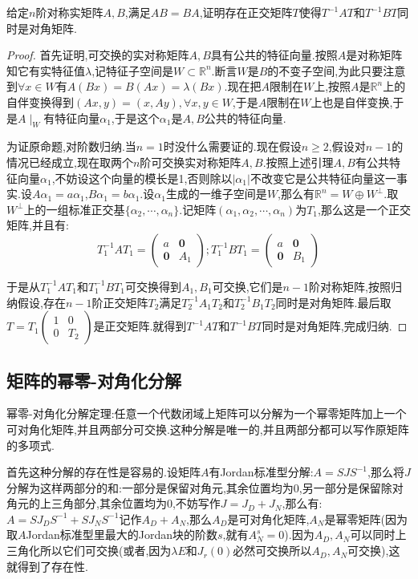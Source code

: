 给定$n$阶对称实矩阵$A,B$,满足$AB=BA$,证明存在正交矩阵$T$使得$T^{-1}AT$和$T^{-1}BT$同时是对角矩阵.
\begin{proof}
	
	首先证明,可交换的实对称矩阵$A,B$具有公共的特征向量.按照$A$是对称矩阵知它有实特征值$\lambda$,记特征子空间是$W\subset\mathbb{R}^n$.断言$W$是$B$的不变子空间,为此只要注意到$\forall x\in W$有$A(Bx)=B(Ax)=\lambda(Bx)$.现在把$A$限制在$W$上,按照$A$是$\mathbb{R}^n$上的自伴变换得到$(Ax,y)=(x,Ay),\forall x,y\in W$,于是$A$限制在$W$上也是自伴变换,于是$A\mid_{W}$有特征向量$\alpha_1$,于是这个$\alpha_1$是$A,B$公共的特征向量.
	
	为证原命题,对阶数归纳.当$n=1$时没什么需要证的.现在假设$n\ge2$,假设对$n-1$的情况已经成立,现在取两个$n$阶可交换实对称矩阵$A,B$.按照上述引理$A,B$有公共特征向量$\alpha_1$,不妨设这个向量的模长是1,否则除以$|\alpha_1|$不改变它是公共特征向量这一事实.设$A\alpha_1=a\alpha_1$,$B\alpha_1=b\alpha_1$.设$\alpha_1$生成的一维子空间是$W$,那么有$\mathbb{R}^n=W\oplus W^{\perp}$.取$W^{\perp}$上的一组标准正交基$\{\alpha_2,\cdots,\alpha_n\}$.记矩阵$(\alpha_1,\alpha_2,\cdots,\alpha_n)$为$T_1$,那么这是一个正交矩阵,并且有:
	$$T_1^{-1}AT_1=\left(\begin{array}{cc}
	a&\textbf{0}\\
	\textbf{0}&A_1\end{array}\right);T_1^{-1}BT_1=\left(\begin{array}{cc}
	a&\textbf{0}\\
	\textbf{0}&B_1\end{array}\right)$$
	
	于是从$T_1^{-1}AT_1$和$T_1^{-1}BT_1$可交换得到$A_1,B_1$可交换,它们是$n-1$阶对称矩阵,按照归纳假设,存在$n-1$阶正交矩阵$T_2$满足$T_2^{-1}A_1T_2$和$T_2^{-1}B_1T_2$同时是对角矩阵.最后取$T=T_1\left(\begin{array}{cc}
	1&0\\
	0&T_2\end{array}\right)$是正交矩阵.就得到$T^{-1}AT$和$T^{-1}BT$同时是对角矩阵,完成归纳.
	
\end{proof}
\newpage
\subsection{矩阵的幂零-对角化分解}

幂零-对角化分解定理:任意一个代数闭域上矩阵可以分解为一个幂零矩阵加上一个可对角化矩阵,并且两部分可交换.这种分解是唯一的,并且两部分都可以写作原矩阵的多项式.

首先这种分解的存在性是容易的.设矩阵$A$有Jordan标准型分解:$A=SJS^{-1}$,那么将$J$分解为这样两部分的和:一部分是保留对角元,其余位置均为0,另一部分是保留除对角元的上三角部分,其余位置均为0,不妨写作$J=J_D+J_N$,那么有:$A=SJ_DS^ {-1}+SJ_NS^{-1}$记作$A_D+A_N$,那么$A_D$是可对角化矩阵,$A_N$是幂零矩阵(因为取$A$Jordan标准型里最大的Jordan块的阶数$s$,就有$A_N^s=0$).因为$A_D,A_N$可以同时上三角化所以它们可交换(或者,因为$\lambda E$和$J_r(0)$必然可交换所以$A_D,A_N$可交换),这就得到了存在性.

